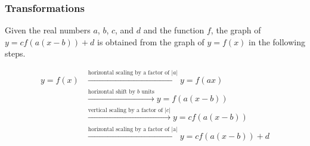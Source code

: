 \begin{description}
\end{description}

\subsubsection{Transformations}
Given the real numbers $a$, $b$, $c$, and $d$ and the function $f$, the graph of $y = cf(a(x - b)) + d$ is obtained from the graph of $y = f(x)$ in the following steps.

\begin{align*}
    y = f(x) &\xrightarrow{\text{horizontal scaling by a factor of |$a$|}} y = f(ax) \\
             &\xrightarrow{\text{horizontal shift by $b$ units}} y = f(a(x - b)) \\
             &\xrightarrow{\text{vertical scaling by a factor of |$c$|}} y = cf(a(x - b)) \\
             &\xrightarrow{\text{horizontal scaling by a factor of |a|}} y = cf(a(x - b)) + d \\
\end{align*}